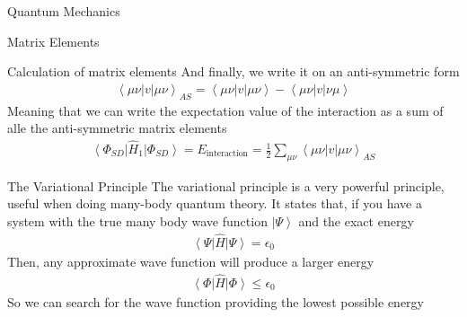 \documentclass[twoside,english]{uiofysmaster}
\begin{document}
\begin{chapter}{Quantum Mechanics}
\begin{section}{Matrix Elements}
\begin{subsection}{Calculation of matrix elements}
			And finally, we write it on an anti-symmetric form
			\begin{align}
				\left< \mu \nu | v | \mu \nu \right>_{AS} = \left< \mu \nu | v | \mu \nu \right> - \left< \mu \nu | v | \nu \mu \right> 
			\end{align}
			Meaning that we can write the expectation value of the interaction as a sum of alle the anti-symmetric matrix elements
			\begin{align}
				\left< \Phi_{SD} \right| \hat H_1 \left| \Phi_{SD} \right> = E_{\text{interaction}} = \frac{1}{2} \sum_{\mu \nu} \left< \mu \nu | v | \mu \nu \right>_{AS}
 			\end{align}
		\end{subsection}
	\end{section}

	\begin{section}{The Variational Principle}
		The variational principle is a very powerful principle, useful when doing many-body quantum theory. It states that, if you have a system with the true many body wave function $\left| \Psi \right>$ and the exact energy
		\begin{align}
			\left< \Psi \right| \hat H \left| \Psi \right> = \epsilon_0
		\end{align}
		Then, any approximate wave function will produce a larger energy \cite{Szabo}
		\begin{align}
			\left< \Phi \right| \hat H \left| \Phi \right> \leq \epsilon_0
		\end{align}
		So we can search for the wave function providing the lowest possible energy 
	\end{section}

\end{chapter}
\end{document}

